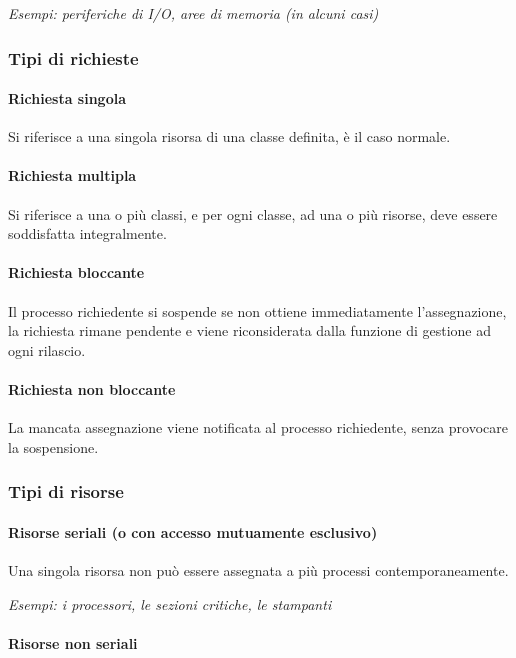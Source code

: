 \textit{Esempi: periferiche di I/O, aree di memoria (in alcuni casi)}

\subsubsection{Tipi di richieste}
\paragraph{Richiesta singola}
Si riferisce a una singola risorsa di una classe definita, è il caso normale.

\paragraph{Richiesta multipla}
Si riferisce a una o più classi, e per ogni classe, ad una o più risorse, deve essere soddisfatta integralmente.

\paragraph{Richiesta bloccante}
Il processo richiedente si sospende se non ottiene immediatamente
l'assegnazione, la richiesta rimane pendente e viene riconsiderata dalla funzione di gestione ad ogni rilascio.

\paragraph{Richiesta non bloccante}
La mancata assegnazione viene notificata al processo richiedente, senza provocare la sospensione.

\subsubsection{Tipi di risorse}

\paragraph{Risorse seriali (o con accesso mutuamente esclusivo)}
Una singola risorsa non può essere assegnata a più processi contemporaneamente.

\textit{Esempi: i processori, le sezioni critiche, le stampanti}

\paragraph{Risorse non seriali}


